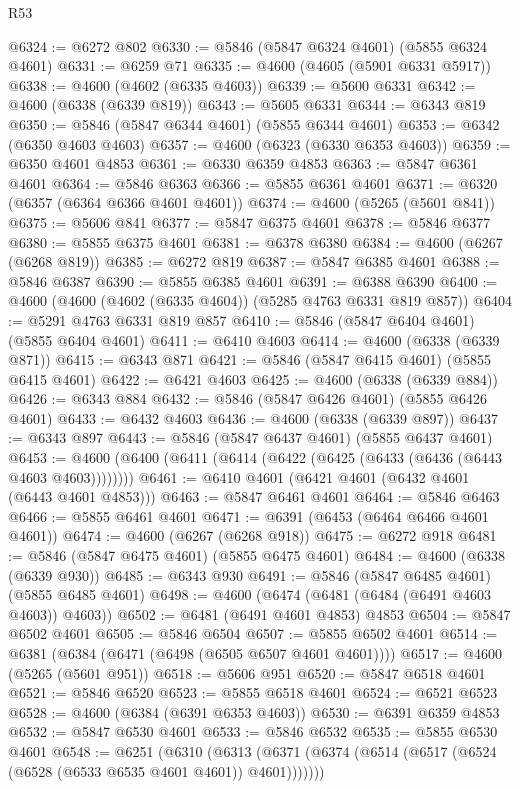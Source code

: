 \begin{lexlean}{R53}
\begin{coremodule}
@6324 := @6272 @802
@6330 := @5846 (@5847 @6324 @4601) (@5855 @6324 @4601)
@6331 := @6259 @71
@6335 := @4600 (@4605 (@5901 @6331 @5917))
@6338 := @4600 (@4602 (@6335 @4603))
@6339 := @5600 @6331
@6342 := @4600 (@6338 (@6339 @819))
@6343 := @5605 @6331
@6344 := @6343 @819
@6350 := @5846 (@5847 @6344 @4601) (@5855 @6344 @4601)
@6353 := @6342 (@6350 @4603 @4603)
@6357 := @4600 (@6323 (@6330 @6353 @4603))
@6359 := @6350 @4601 @4853
@6361 := @6330 @6359 @4853
@6363 := @5847 @6361 @4601
@6364 := @5846 @6363
@6366 := @5855 @6361 @4601
@6371 := @6320 (@6357 (@6364 @6366 @4601 @4601))
@6374 := @4600 (@5265 (@5601 @841))
@6375 := @5606 @841
@6377 := @5847 @6375 @4601
@6378 := @5846 @6377
@6380 := @5855 @6375 @4601
@6381 := @6378 @6380
@6384 := @4600 (@6267 (@6268 @819))
@6385 := @6272 @819
@6387 := @5847 @6385 @4601
@6388 := @5846 @6387
@6390 := @5855 @6385 @4601
@6391 := @6388 @6390
@6400 := @4600 (@4600 (@4602 (@6335 @4604)) (@5285 @4763 @6331 @819 @857))
@6404 := @5291 @4763 @6331 @819 @857
@6410 := @5846 (@5847 @6404 @4601) (@5855 @6404 @4601)
@6411 := @6410 @4603
@6414 := @4600 (@6338 (@6339 @871))
@6415 := @6343 @871
@6421 := @5846 (@5847 @6415 @4601) (@5855 @6415 @4601)
@6422 := @6421 @4603
@6425 := @4600 (@6338 (@6339 @884))
@6426 := @6343 @884
@6432 := @5846 (@5847 @6426 @4601) (@5855 @6426 @4601)
@6433 := @6432 @4603
@6436 := @4600 (@6338 (@6339 @897))
@6437 := @6343 @897
@6443 := @5846 (@5847 @6437 @4601) (@5855 @6437 @4601)
@6453 := @4600 (@6400 (@6411 (@6414 (@6422 (@6425 (@6433 (@6436 (@6443 @4603 @4603))))))))
@6461 := @6410 @4601 (@6421 @4601 (@6432 @4601 (@6443 @4601 @4853)))
@6463 := @5847 @6461 @4601
@6464 := @5846 @6463
@6466 := @5855 @6461 @4601
@6471 := @6391 (@6453 (@6464 @6466 @4601 @4601))
@6474 := @4600 (@6267 (@6268 @918))
@6475 := @6272 @918
@6481 := @5846 (@5847 @6475 @4601) (@5855 @6475 @4601)
@6484 := @4600 (@6338 (@6339 @930))
@6485 := @6343 @930
@6491 := @5846 (@5847 @6485 @4601) (@5855 @6485 @4601)
@6498 := @4600 (@6474 (@6481 (@6484 (@6491 @4603 @4603)) @4603))
@6502 := @6481 (@6491 @4601 @4853) @4853
@6504 := @5847 @6502 @4601
@6505 := @5846 @6504
@6507 := @5855 @6502 @4601
@6514 := @6381 (@6384 (@6471 (@6498 (@6505 @6507 @4601 @4601))))
@6517 := @4600 (@5265 (@5601 @951))
@6518 := @5606 @951
@6520 := @5847 @6518 @4601
@6521 := @5846 @6520
@6523 := @5855 @6518 @4601
@6524 := @6521 @6523
@6528 := @4600 (@6384 (@6391 @6353 @4603))
@6530 := @6391 @6359 @4853
@6532 := @5847 @6530 @4601
@6533 := @5846 @6532
@6535 := @5855 @6530 @4601
@6548 := @6251
    (@6310 (@6313 (@6371 (@6374 (@6514 (@6517 (@6524 (@6528 (@6533 @6535 @4601 @4601)) @4601)))))))

\end{coremodule}
\end{lexlean}
